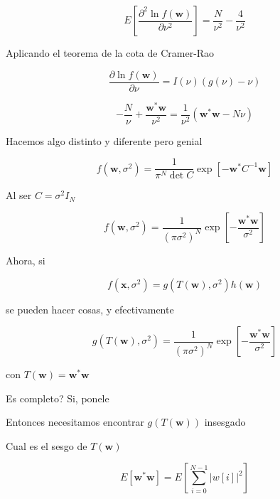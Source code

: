 \begin{equation}
    E\left[\frac{\partial^2 \ln f(\mathbf{w})}{\partial \nu^2}\right] =  \frac{N}{\nu^2} -  \frac{4}{\nu^2}
\end{equation}

Aplicando el teorema de la cota de Cramer-Rao

\begin{equation}
    \frac{\partial \ln f(\mathbf{w})}{\partial \nu} =  I(\nu)\left(g(\nu)-\nu\right)
\end{equation}

\begin{equation}
    - \frac{N}{\nu} + \frac{\mathbf{w}^\ast \mathbf{w}}{\nu^2} =  \frac{1}{\nu^2} \left(\mathbf{w}^\ast\mathbf{w}-N\nu \right)
\end{equation}

Hacemos algo distinto y diferente pero genial

\begin{equation}
    f(\mathbf{w}, \sigma^2) = \frac{1}{\pi^N \det C} \exp\left[- \mathbf{w}^\ast C^{-1} \mathbf{w}\right]
\end{equation}

Al ser $C = \sigma^2 I_N$

\begin{equation}
    f(\mathbf{w}, \sigma^2) = \frac{1}{\left(\pi \sigma^2\right)^N} \exp\left[- \frac{\mathbf{w}^\ast \mathbf{w}}{\sigma^2}\right]
\end{equation}

Ahora, si

\begin{equation}
    f(\mathbf{x}, \sigma^2) = g(T(\mathbf{w}), \sigma^2)h(\mathbf{w})
\end{equation}

se pueden hacer cosas, y efectivamente

\begin{equation}
    g(T(\mathbf{w}), \sigma^2) = \frac{1}{\left(\pi \sigma^2\right)^N} \exp\left[- \frac{\mathbf{w}^\ast \mathbf{w}}{\sigma^2}\right]
\end{equation}

con $T(\mathbf{w}) = \mathbf{w}^\ast\mathbf{w}$

Es completo? Si, ponele

Entonces necesitamos encontrar $g(T(\mathbf{w}))$ insesgado

Cual es el sesgo de $T(\mathbf{w})$

\begin{equation}
    E\left[\mathbf{w}^\ast\mathbf{w}\right] =     E\left[\sum_{i=0}^{N-1}\lvert w[i]\rvert^2\right] 
\end{equation}

